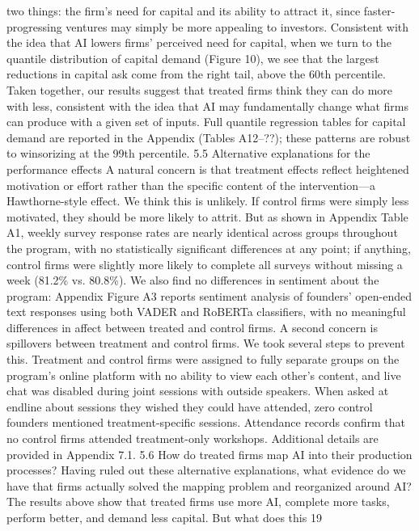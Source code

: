 two things: the firm’s need for capital and its ability to attract it, since faster-progressing ventures
may simply be more appealing to investors. Consistent with the idea that AI lowers firms’ perceived
need for capital, when we turn to the quantile distribution of capital demand (Figure 10), we see
that the largest reductions in capital ask come from the right tail, above the 60th percentile. Taken
together, our results suggest that treated firms think they can do more with less, consistent with
the idea that AI may fundamentally change what firms can produce with a given set of inputs. Full
quantile regression tables for capital demand are reported in the Appendix (Tables A12–??); these
patterns are robust to winsorizing at the 99th percentile.
5.5
Alternative explanations for the performance effects
A natural concern is that treatment effects reflect heightened motivation or effort rather than
the specific content of the intervention—a Hawthorne-style effect. We think this is unlikely. If
control firms were simply less motivated, they should be more likely to attrit. But as shown in
Appendix Table A1, weekly survey response rates are nearly identical across groups throughout
the program, with no statistically significant differences at any point; if anything, control firms
were slightly more likely to complete all surveys without missing a week (81.2\% vs. 80.8\%). We
also find no differences in sentiment about the program: Appendix Figure A3 reports sentiment
analysis of founders’ open-ended text responses using both VADER and RoBERTa classifiers, with
no meaningful differences in affect between treated and control firms.
A second concern is spillovers between treatment and control firms. We took several steps to
prevent this. Treatment and control firms were assigned to fully separate groups on the program’s
online platform with no ability to view each other’s content, and live chat was disabled during
joint sessions with outside speakers. When asked at endline about sessions they wished they could
have attended, zero control founders mentioned treatment-specific sessions.
Attendance records
confirm that no control firms attended treatment-only workshops. Additional details are provided
in Appendix 7.1.
5.6
How do treated firms map AI into their production processes?
Having ruled out these alternative explanations, what evidence do we have that firms actually
solved the mapping problem and reorganized around AI? The results above show that treated firms
use more AI, complete more tasks, perform better, and demand less capital. But what does this
19
